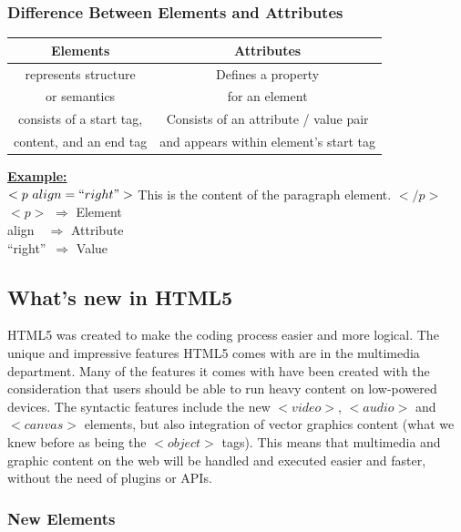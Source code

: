 \documentclass[11pt,a4paper]{article}
\begin{document}
\subsubsection {Difference Between Elements and Attributes}
\begin{center}
\begin{tabular}{| c | c |}\hline
\textbf{Elements} & \textbf{Attributes} \\ \hline
represents structure & Defines a property \\ 
or semantics & for an element\\\hline
consists of a start tag, & Consists of an attribute / value pair\\
content, and an end tag & and appears within element's start tag\\ \hline
\end{tabular}
\end{center}

\underline{\textbf{Example:}}\\

$<p\ align = ``right">$ This is the content of the paragraph element.
                                                         $</p>$\\
$<p>$ $\Rightarrow$ Element\\
align\ \  $\Rightarrow$ Attribute\\
``right''\ $\Rightarrow$ Value\\

\subsection*{What’s new in HTML5}
HTML5 was created to make the coding process easier and more logical. The unique and impressive features HTML5 comes with are in the multimedia department. Many of the features it comes with have been created with the consideration that users should be able to run heavy content on low-powered devices. The syntactic features include the new $<video>$, $<audio>$ and $<canvas>$ elements, but also integration of vector graphics content (what we knew before as being the $<object>$ tags). This means that multimedia and graphic content on the web will be handled and executed easier and faster, without the need of plugins or APIs.

\subsubsection*{New Elements}
\end{document}
